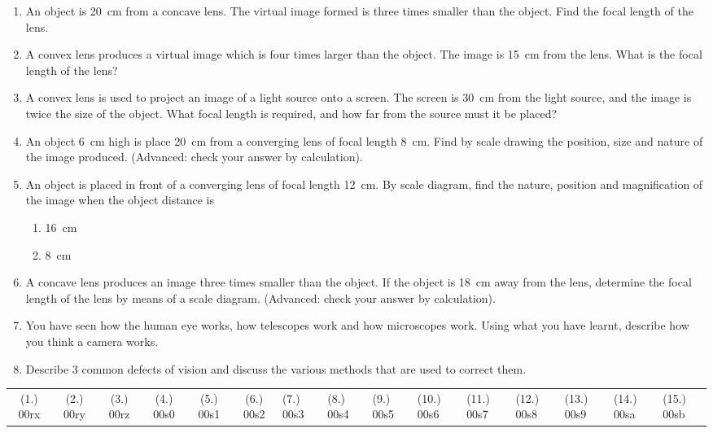 \begin{eocexercises}{}
\begin{enumerate}
\item An object is 20~cm from a concave lens. The virtual image formed is three times smaller than the object. Find the focal length of the lens.
\item A convex lens produces a virtual image which is four times larger than the object. The image is 15~cm from the lens. What is the focal length of the lens?
\item A convex lens is used to project an image of a light source onto a screen. The screen is 30~cm from the light source, and the image is twice the size of the object. What focal length is required, and how far from the source must it be placed?
\item An object 6~cm high is place 20~cm from a converging lens of focal length 8~cm. Find by scale drawing the position, size and nature of the image produced. (Advanced: check your answer by calculation).
\item An object is placed in front of a converging lens of focal length 12~cm. By scale diagram, find the nature, position and magnification of the image when the object distance is
\begin{enumerate}
\item 16~cm
\item 8~cm
\end{enumerate}
\item A concave lens produces an image three times smaller than the object. If the object is 18~cm away from the lens, determine the focal length of the lens by means of a scale diagram. (Advanced: check your answer by calculation).
\item You have seen how the human eye works, how telescopes work and how microscopes work. Using what you have learnt, describe how you think a camera works.
\item Describe 3 common defects of vision and discuss the various methods that are used to correct them.

\end{enumerate}
\practiceinfo

\begin{tabular}[h]{cccccc}
(1.) 00rx & (2.) 00ry & (3.) 00rz & (4.) 00s0 & (5.) 00s1 & (6.) 00s2 & (7.) 00s3 & (8.) 00s4 & (9.) 00s5 & (10.) 00s6 & (11.) 00s7 & (12.) 00s8 & (13.) 00s9 & (14.) 00sa & (15.) 00sb & 
 \end{tabular}
\end{eocexercises}





